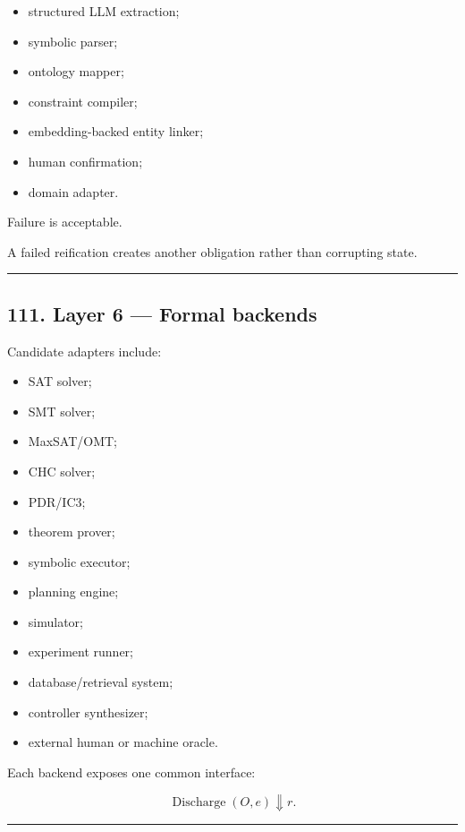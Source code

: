\documentclass[
]{article}
\providecommand{\tightlist}{%
  \setlength{\itemsep}{0pt}\setlength{\parskip}{0pt}}
\begin{document}
\begin{itemize}
\tightlist
\item
  structured LLM extraction;
\item
  symbolic parser;
\item
  ontology mapper;
\item
  constraint compiler;
\item
  embedding-backed entity linker;
\item
  human confirmation;
\item
  domain adapter.
\end{itemize}

Failure is acceptable.

A failed reification creates another obligation rather than corrupting
state.

\begin{center}\rule{0.5\linewidth}{0.5pt}\end{center}

\subsection{111. Layer 6 --- Formal
backends}\label{layer-6-formal-backends}

Candidate adapters include:

\begin{itemize}
\tightlist
\item
  SAT solver;
\item
  SMT solver;
\item
  MaxSAT/OMT;
\item
  CHC solver;
\item
  PDR/IC3;
\item
  theorem prover;
\item
  symbolic executor;
\item
  planning engine;
\item
  simulator;
\item
  experiment runner;
\item
  database/retrieval system;
\item
  controller synthesizer;
\item
  external human or machine oracle.
\end{itemize}

Each backend exposes one common interface:

\[
\boxed{
\operatorname{Discharge}(O,e)\Downarrow r.
}
\]

\begin{center}\rule{0.5\linewidth}{0.5pt}\end{center}
\end{document}
